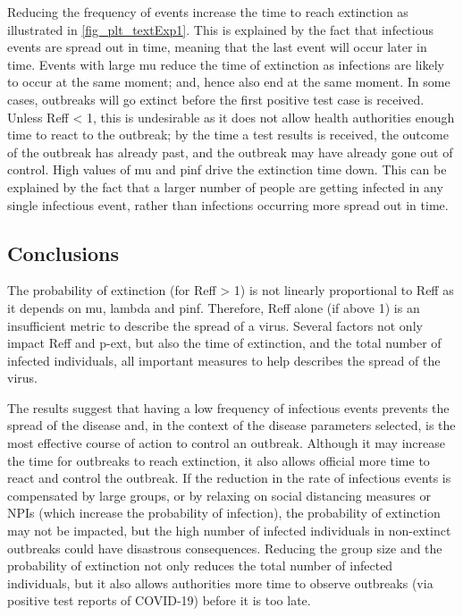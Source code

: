 \documentclass[sr]{drdc-report}
\begin{document}
Reducing the frequency of events increase the time to reach extinction as illustrated in  \ref{fig_plt_textExp1}. This is explained by the fact that infectious events are spread out in time, meaning that the last event will occur later in time. Events with large mu reduce the time of extinction as infections are likely to occur at the same moment; and, hence also end at the same moment. In some cases, outbreaks will go extinct before the first positive test case is received. Unless Reff < 1, this is undesirable as it does not allow health authorities enough time to react to the outbreak; by the time a test results is received, the outcome of the outbreak has already past, and the outbreak may have already gone out of control. High values of mu and pinf drive the extinction time down. This can be explained by the fact that a larger number of people are getting infected in any single infectious event, rather than infections occurring more spread out in time.  

\subsection{Conclusions}

The probability of extinction (for Reff > 1) is not linearly proportional to Reff as it depends on mu, lambda and pinf. Therefore, Reff alone (if above 1) is an insufficient metric to describe the spread of a virus. Several factors not only impact Reff and p-ext, but also the time of extinction, and the total number of infected individuals, all important measures to help describes the spread of the virus. 

The results suggest that having a low frequency of infectious events prevents the spread of the disease and, in the context of the disease parameters selected, is the most effective course of action to control an outbreak. Although it may increase the time for outbreaks to reach extinction, it also allows official more time to react and control the outbreak. If the reduction in the rate of infectious events is compensated by large groups, or by relaxing on social distancing measures or NPIs (which increase the probability of infection), the probability of extinction may not be impacted, but the high number of infected individuals in non-extinct outbreaks could have disastrous consequences. Reducing the group size and the probability of extinction not only reduces the total number of infected individuals, but it also allows authorities more time to observe outbreaks (via positive test reports of COVID-19) before it is too late.  
\end{document}
